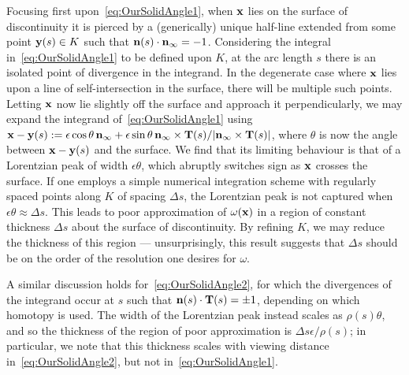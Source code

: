     Focusing first upon~\eqref{eq:OurSolidAngle1}, when $\bf x$ lies on the surface of discontinuity it is pierced by a (generically) unique half-line extended from some point ${\bf y}(s) \in K$ such that ${\bf n}(s) \cdot {\bf n}_\infty = -1$. Considering the integral in~\eqref{eq:OurSolidAngle1} to be defined upon $K$, at the arc length $s$ there is an isolated point of divergence in the integrand. In the degenerate case where ${\bf x}$ lies upon a line of self-intersection in the surface, there will be multiple such points. Letting ${\bf x}$ now lie slightly off the surface and approach it perpendicularly, we may expand the integrand of~\eqref{eq:OurSolidAngle1} using ${\bf x}-{\bf y}(s) := \epsilon \cos \theta\, {\bf n}_\infty + \epsilon \sin \theta\, {\bf n}_\infty \times {\bf T}(s) / |{\bf n}_\infty \times {\bf T}(s)| $, where $\theta$ is now the angle between $ {\bf x}-{\bf y}(s)$ and the surface. We find that its limiting behaviour is that of a Lorentzian peak of width $\epsilon \theta$, which abruptly switches sign as ${\bf x}$ crosses the surface. If one employs a simple numerical integration scheme with regularly spaced points along $K$ of spacing $\Delta s$, the Lorentzian peak is not captured when $\epsilon \theta \approx \Delta s$. This leads to poor approximation of $\omega({\bf x})$ in a region of constant thickness $\Delta s$ about the surface of discontinuity. By refining $K$, we may reduce the thickness of this region --- unsurprisingly, this result suggests that $\Delta s$ should be on the order of the resolution one desires for $\omega$.

    A similar discussion holds for~\eqref{eq:OurSolidAngle2}, for which the divergences of the integrand occur at $s$ such that ${\bf n}(s)\cdot{\bf T}(s) = \pm 1$, depending on which homotopy is used. The width of the Lorentzian peak instead scales as $\rho(s) \theta$, and so the thickness of the region of poor approximation is $\Delta s \epsilon/ \rho (s)$; in particular, we note that this thickness scales with viewing distance in~\eqref{eq:OurSolidAngle2}, but not in~\eqref{eq:OurSolidAngle1}.

